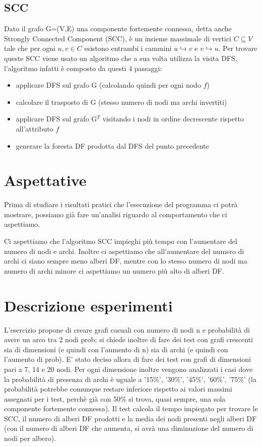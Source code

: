 \documentclass{article}
\begin{document}
\subsection{SCC}
Dato il grafo G=(V,E) una componente fortemente connessa, detta anche Strongly Connected Component (SCC), è un insieme massimale di vertici $C \subseteq V$ tale che per ogni $u,v \in C$ esistono entrambi i cammini $u \hookrightarrow v$ e $v \hookrightarrow u$.
Per trovare queste SCC viene usato un algoritmo che a sua volta utilizza la visita DFS, l'algoritmo infatti è composto da questi 4 passaggi:
\begin{itemize}
\item applicare DFS sul grafo G (calcolando quindi per ogni nodo $f$)
\item calcolare il trasposto di G (stesso numero di nodi ma archi invertiti)
\item applicare DFS sul grafo G$^T$ visitando i nodi in ordine decrescente rispetto all'attributo $f$
\item generare la foresta DF prodotta dal DFS del punto precedente
\end{itemize}

\section{Aspettative}
Prima di studiare i risultati pratici che l'esecuzione del programma ci potrà mostrare, possiamo già fare un'analisi riguardo al comportamento che ci aspettiamo.

Ci aspettiamo che l'algoritmo SCC impieghi più tempo con l'aumentare del numero di nodi e archi. Inoltre ci aspettiamo che all'aumentare del numero di archi ci siano sempre meno alberi DF, mentre con lo stesso numero di nodi ma numero di archi minore ci aspettiamo un numero più alto di alberi DF.

\section{Descrizione esperimenti}
L'esercizio propone di creare grafi casuali con numero di nodi n e probabilità di avere un arco tra 2 nodi prob; si chiede inoltre di fare dei test con grafi crescenti sia di dimensioni (e quindi con l'aumento di n) sia di archi (e quindi con l'aumento di prob). E' stato deciso allora di fare dei test con grafi di dimensioni pari a 7, 14 e 20 nodi. Per ogni dimensione inoltre vengono analizzati i casi dove la probabilità di presenza di archi è uguale a '15\%', '30\%', '45\%', '60\%', '75\%' (la probabilità potrebbe comunque restare inferiore rispetto ai valori massimi assegnati per i test, perchè già con 50\% si trova, quasi sempre, una sola componente fortemente connessa). Il test calcola il tempo impiegato per trovare le SCC, il numero di alberi DF prodotti e la media dei nodi presenti negli alberi DF (con il numero di alberi DF che aumenta, si avrà una diminuzione del numero di nodi per albero).
\newpage
\end{document}
